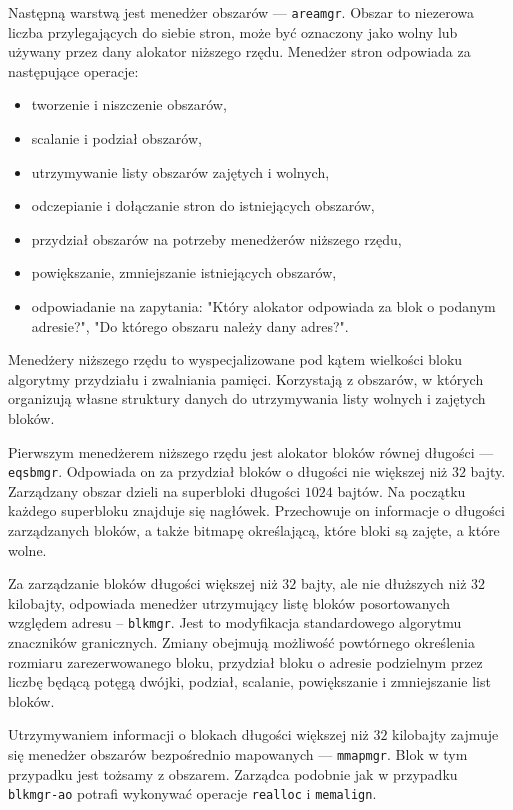 \documentclass[12pt,a4paper,titlepage,twoside]{mwart}
\begin{document}
Następną warstwą jest menedżer obszarów --- \texttt{areamgr}. Obszar to
niezerowa liczba przylegających do siebie stron, może być oznaczony jako wolny
lub używany przez dany alokator niższego rzędu. Menedżer stron odpowiada za
następujące operacje:
\begin{itemize}
\item tworzenie i niszczenie obszarów,
\item scalanie i podział obszarów,
\item utrzymywanie listy obszarów zajętych i wolnych,
\item odczepianie i dołączanie stron do istniejących obszarów,
\item przydział obszarów na potrzeby menedżerów niższego rzędu,
\item powiększanie, zmniejszanie istniejących obszarów,
\item odpowiadanie na zapytania: "Który alokator odpowiada za blok o podanym
adresie?", "Do którego obszaru należy dany adres?".
\end{itemize}

Menedżery niższego rzędu to wyspecjalizowane pod kątem wielkości bloku
algorytmy przydziału i zwalniania pamięci. Korzystają z obszarów, w których
organizują własne struktury danych do utrzymywania listy wolnych i zajętych
bloków.

Pierwszym menedżerem niższego rzędu jest alokator bloków równej długości ---
\texttt{eqsbmgr}.  Odpowiada on za przydział bloków o długości nie większej niż
$32$ bajty.  Zarządzany obszar dzieli na superbloki długości $1024$ bajtów. Na
początku każdego superbloku znajduje się nagłówek. Przechowuje on informacje o
długości zarządzanych bloków, a także bitmapę określającą, które bloki
są zajęte, a które wolne.

Za zarządzanie bloków długości większej niż $32$ bajty, ale nie dłuższych niż
$32$ kilobajty, odpowiada menedżer utrzymujący listę bloków posortowanych
względem adresu -- \texttt{blkmgr}. Jest to modyfikacja standardowego algorytmu
znaczników granicznych. Zmiany obejmują możliwość powtórnego określenia rozmiaru
zarezerwowanego bloku, przydział bloku o adresie podzielnym przez liczbę będącą
potęgą dwójki, podział, scalanie, powiększanie i zmniejszanie list bloków.

Utrzymywaniem informacji o blokach długości większej niż $32$ kilobajty zajmuje
się menedżer obszarów bezpośrednio mapowanych --- \texttt{mmapmgr}. Blok w tym
przypadku jest tożsamy z obszarem. Zarządca podobnie jak w przypadku
\texttt{blkmgr-ao} potrafi wykonywać operacje \texttt{realloc} i
\texttt{memalign}.
\end{document}
